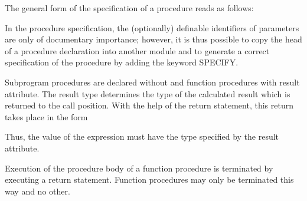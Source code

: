 \begin{grammarframe}














\end{grammarframe}

The general form of the specification of a procedure reads as follows:

\begin{grammarframe}



\end{grammarframe}

In the procedure specification, the (optionally) definable identifiers of
parameters are only of documentary importance; however, it is thus
possible to copy the head of a procedure declaration into another module
and to generate a correct specification of the procedure by adding the
keyword SPECIFY.

Subprogram procedures are declared without and function procedures with
result attribute. The result type determines the type of the calculated
result which is returned to the call position. With the help of the
return statement, this return takes place in the form

\begin{grammarframe}

\end{grammarframe}

Thus, the value of the expression must have the type specified by the
result attribute.

Execution of the procedure body of a function procedure is terminated by
executing a return statement. Function procedures may only be terminated
this way and no other.

